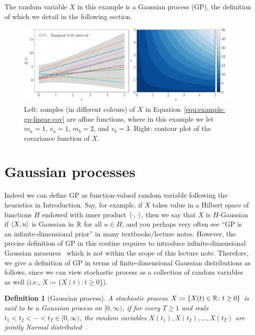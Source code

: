\documentclass[]{article}
\newtheorem{definition}[theorem]{Definition}
\begin{document}
The random variable $X$ in this example is a Gaussian process (GP), the definition of which we detail in the following section. 
%
\begin{figure}[h!]
	\centering
	\includegraphics[width=.99\linewidth]{figs/example-gp-affine-sample-cov}
	\caption{Left: samples (in different colours) of $X$ in Equation~\eqref{equ:example-gp-linear-cov} are affine functions, where in this example we let $m_a = 1$, $v_a = 1$, $m_b = 2$, and $v_b = 3$. Right: contour plot of the covariance function of $X$.}
	\label{fig:example-gp-cov-linear}
\end{figure}

\section{Gaussian processes}
\label{sec:gp}
Indeed we can define GP as function-valued random variable following the heuristics in Introduction. Say, for example, if $X$ takes value in a Hilbert space of functions $H$ endowed with inner product $\langle\cdot, \cdot\rangle$, then we say that $X$ is $H$-Gaussian if $\langle X, u\rangle$ is Gaussian in $\mathbb{R}$ for all $u \in H$, and you perhaps very often see ``GP is an infinite-dimensional prior'' in many textbooks/lecture notes. However, the precise definition of GP in this routine requires to introduce infinite-dimensional Gaussian measures~\citep[see, e.g.,][]{Kuo1975} which is not within the scope of this lecture note. Therefore, we give a definition of GP in terms of finite-dimensional Gaussian distributions as follows, since we can view stochastic process as a collection of random variables as well (i.e., $X\coloneqq \lbrace X(t) \colon t\geq 0\rbrace$).

\begin{definition}[Gaussian process]
	\label{def:gp}
	A stochastic process $X\coloneqq \lbrace X(t) \in \mathbb{R} \colon t\geq 0\rbrace$ is said to be a Gaussian process on $[0, \infty)$, if for every $T \geq 1$ and reals $t_1<t_2<\cdots <t_T \in [0, \infty)$, the random variables $X(t_1), X(t_2), \ldots, X(t_T)$ are jointly Normal distributed~\citep{Karatzas1991}.
\end{definition}
\end{document}
